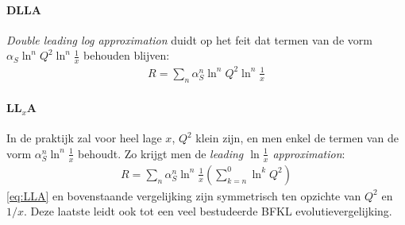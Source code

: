 \documentclass[a4paper,11pt]{article}
\numberwithin{equation}{section} %
\begin{document}
      \paragraph{DLLA}
\textit{Double leading log approximation} duidt op het feit dat termen van de vorm $\alpha_S \ln^n{Q^2} \ln^n{\frac{1}{x}}$ behouden blijven:
\begin{align}
R = \sum_n \alpha_S^n \ln^n{Q^2} \ln^n{\frac{1}{x}}
\end{align}

      \paragraph{LL$_x$A}
In de praktijk zal voor heel lage $x$, $Q^2$ klein zijn, en men enkel de termen van de vorm $\alpha_S^n \ln^n{\frac{1}{x}}$ behoudt. Zo krijgt men de \textit{leading $\ln{\frac{1}{x}}$ approximation}:
\begin{align}
R = \sum_n \alpha_S^n \ln^n{\frac{1}{x}} \left( \sum_{k=n}^0 \ln^k{Q^2} \right)
\end{align}
\eqref{eq:LLA} en bovenstaande vergelijking zijn symmetrisch ten opzichte van $Q^2$ en $1/x$. Deze laatste leidt ook tot een veel bestudeerde BFKL evolutievergelijking.
\end{document}
